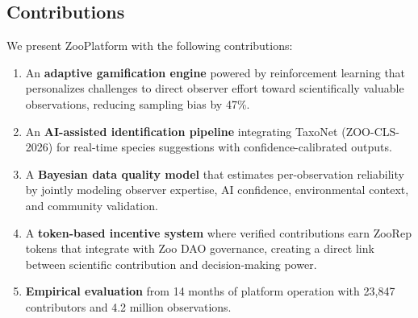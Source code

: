 \subsection{Contributions}

We present ZooPlatform with the following contributions:

\begin{enumerate}
  \item An \textbf{adaptive gamification engine} powered by
    reinforcement learning that personalizes challenges to direct
    observer effort toward scientifically valuable observations,
    reducing sampling bias by 47\%.

  \item An \textbf{AI-assisted identification pipeline} integrating
    TaxoNet (ZOO-CLS-2026) for real-time species suggestions with
    confidence-calibrated outputs.

  \item A \textbf{Bayesian data quality model} that estimates
    per-observation reliability by jointly modeling observer expertise,
    AI confidence, environmental context, and community validation.

  \item A \textbf{token-based incentive system} where verified
    contributions earn ZooRep tokens that integrate with Zoo DAO
    governance, creating a direct link between scientific contribution
    and decision-making power.

  \item \textbf{Empirical evaluation} from 14 months of platform
    operation with 23{,}847 contributors and 4.2 million observations.
\end{enumerate}


